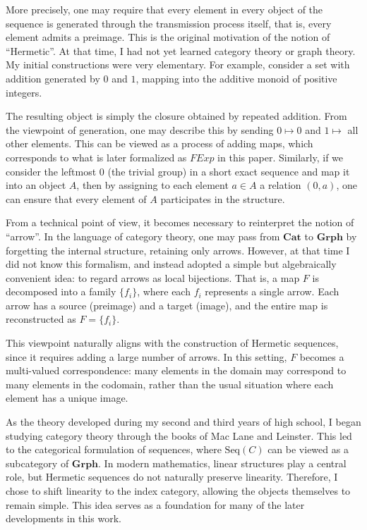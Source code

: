 \documentclass[11pt]{book}
\theoremstyle{definition}
\theoremstyle{plain}
\theoremstyle{remark}
\begin{document}
More precisely, one may require that every element in every object of the sequence is generated through 
the transmission process itself, that is, every element admits a preimage. This is the original motivation of the notion 
of ``Hermetic''. At that time, I had not yet learned category theory or graph theory. My initial constructions were very 
elementary. For example, consider a set with addition generated by $0$ and $1$, mapping into the additive monoid of 
positive integers. 

The resulting object is simply the closure obtained by repeated addition. From the viewpoint of generation, 
one may describe this by sending $0 \mapsto 0$ and $1 \mapsto$ all other elements. This can be viewed as a process of adding maps, 
which corresponds to what is later formalized as $FExp$ in this paper. Similarly, if we consider the leftmost $0$ (the trivial group) 
in a short exact sequence and map it into an object $A$, then by assigning to each element $a \in A$ a relation $(0,a)$, one can ensure 
that every element of $A$ participates in the structure.
\medskip

From a technical point of view, it becomes necessary to reinterpret the notion of ``arrow''. In the language of category theory, one may 
pass from $\mathbf{Cat}$ to $\mathbf{Grph}$ by forgetting the internal structure, retaining only arrows. However, at that time I did not know 
this formalism, and instead adopted a simple but algebraically convenient idea: to regard arrows as local bijections. That is, a map $F$ is decomposed 
into a family $\{f_i\}$, where each $f_i$ represents a single arrow. Each arrow has a source (preimage) and a target (image), and the entire map is 
reconstructed as $F = \{f_i\}$. 

This viewpoint naturally aligns with the construction of Hermetic sequences, since it requires adding a large number of arrows. In this setting, $F$ 
becomes a multi-valued correspondence: many elements in the domain may correspond to many elements in the codomain, rather than the usual situation 
where each element has a unique image.

\medskip
As the theory developed during my second and third years of high school, I began studying category theory through the books of Mac Lane and Leinster. 
This led to the categorical formulation of sequences, where $\mathrm{Seq}(C)$ can be viewed as a subcategory of $\mathbf{Grph}$. In modern mathematics, 
linear structures play a central role, but Hermetic sequences do not naturally preserve linearity. Therefore, I chose to shift linearity to the index 
category, allowing the objects themselves to remain simple. This idea serves as a foundation for many of the later developments in this work.
\end{document}
